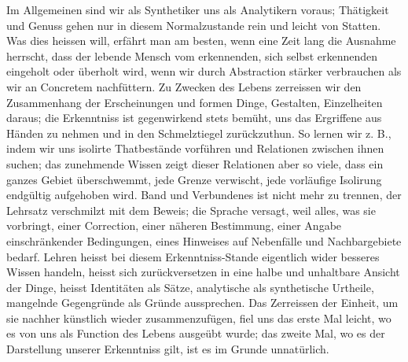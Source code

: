 Im Allgemeinen sind wir als Synthetiker uns als Analytikern voraus; Thätigkeit und Genuss gehen nur in diesem Normalzustande rein und leicht von Statten. Was dies heissen will, erfährt man am besten, wenn eine Zeit lang die Ausnahme herrscht, dass der lebende Mensch vom erkennenden, sich selbst erkennenden eingeholt oder überholt wird, wenn wir durch Abstraction stärker verbrauchen als wir an Concretem nachfüttern. Zu Zwecken des Lebens zerreissen wir den Zusammenhang der Erscheinungen und formen Dinge, Gestalten, Einzelheiten daraus; die Erkenntniss ist gegenwirkend stets bemüht, uns das Ergriffene aus Händen zu nehmen und in den Schmelztiegel zurückzuthun. So lernen wir z. B., indem wir uns isolirte Thatbestände vorführen und Relationen zwischen ihnen suchen; das zunehmende Wissen zeigt dieser Relationen aber so viele, dass ein ganzes Gebiet überschwemmt, jede Grenze verwischt, jede vorläufige Isolirung endgültig aufgehoben wird. Band und Verbundenes ist nicht mehr zu trennen, der Lehrsatz verschmilzt mit dem Beweis; die Sprache versagt, weil alles, was sie vorbringt, einer Correction, einer näheren Bestimmung, einer Angabe einschränkender Bedingungen, eines Hinweises auf Nebenfälle und Nachbargebiete bedarf. Lehren heisst bei diesem Erkenntniss-Stande eigentlich wider besseres Wissen handeln, heisst sich zurückversetzen in eine halbe und unhaltbare Ansicht der Dinge, heisst Identitäten als Sätze, analytische als synthetische Urtheile, mangelnde Gegengründe als Gründe aussprechen. Das Zerreissen der Einheit, um sie nachher künstlich wieder zusammenzufügen, fiel uns das erste Mal leicht, wo es von uns als Function des Lebens ausgeübt wurde; das zweite Mal, wo es der Darstellung unserer Erkenntniss gilt, ist es im Grunde unnatürlich.
\par

